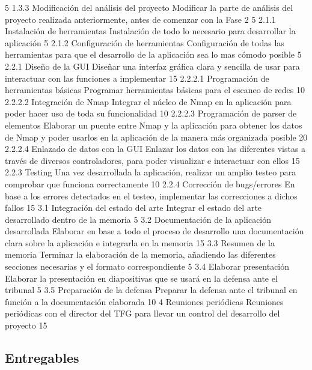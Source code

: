 	{5}
\taskframe
	{1.3.3}
	{Modificación del análisis del proyecto}
	{Modificar la parte de análisis del proyecto realizada anteriormente, antes de comenzar con la Fase 2}
	{5}					
\taskframe
	{2.1.1}
	{Instalación de herramientas}
	{Instalación de todo lo necesario para desarrollar la aplicación}
	{5}
\taskframe
	{2.1.2}
	{Configuración de herramientas}
	{Configuración de todas las herramientas para que el desarrollo de la aplicación sea lo mas cómodo posible}
	{5}
\taskframe
	{2.2.1}
	{Diseño de la GUI}
	{Diseñar una interfaz gráfica clara y sencilla de usar para interactuar con las funciones a implementar}
	{15}
\taskframe
	{2.2.2.1}
	{Programación de herramientas básicas}
	{Programar herramientas básicas para el escaneo de redes}
	{10}
\taskframe
	{2.2.2.2}
	{Integración de Nmap}
	{Integrar el núcleo de Nmap en la aplicación para poder hacer uso de toda su funcionalidad}
	{10}
\taskframe
	{2.2.2.3}
	{Programación de parser de elementos}
	{Elaborar un puente entre Nmap y la aplicación para obtener los datos de Nmap y poder usarlos en la aplicación de la manera más organizada posible}
	{20}
\taskframe
	{2.2.2.4}
	{Enlazado de datos con la GUI}
	{Enlazar los datos con las diferentes vistas a través de diversos controladores, para poder visualizar e interactuar con ellos}
	{15}
\taskframe
	{2.2.3}
	{Testing}
	{Una vez desarrollada la aplicación, realizar un amplio testeo para comprobar que funciona correctamente}
	{10}
\taskframe
	{2.2.4}
	{Corrección de bugs/errores}
	{En base a los errores detectados en el testeo, implementar las correcciones a dichos fallos}
	{15}
\taskframe
	{3.1}
	{Integración del estado del arte}
	{Integrar el estado del arte desarrollado dentro de la memoria}
	{5}
\taskframe
	{3.2}
	{Documentación de la aplicación desarrollada}
	{Elaborar en base a todo el proceso de desarrollo una documentación clara sobre la aplicación e integrarla en la memoria}
	{15}
\taskframe
	{3.3}
	{Resumen de la memoria}
	{Terminar la elaboración de la memoria, añadiendo las diferentes secciones necesarias y el formato correspondiente}
	{5}
\taskframe
	{3.4}
	{Elaborar presentación}
	{Elaborar la presentación en diapositivas que se usará en la defensa ante el tribunal}
	{5}
\taskframe
	{3.5}
	{Preparación de la defensa}
	{Preparar la defensa ante el tribunal en función a la documentación elaborada}
	{10}
\taskframe
	{4}
	{Reuniones periódicas}
	{Reuniones periódicas con el director del TFG para llevar un control del desarrollo del proyecto}
	{15}

\subsection{Entregables}

